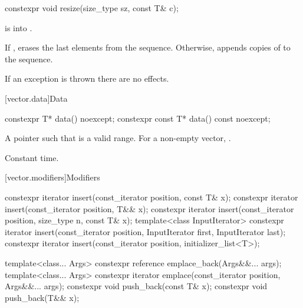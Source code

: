 %
\begin{itemdecl}
constexpr void resize(size_type sz, const T& c);
\end{itemdecl}

\begin{itemdescr}
\pnum
\pnum
\expects
{} is
 into .

\effects
If , erases the last  elements
from the sequence. Otherwise,
appends  copies of  to the sequence.

\pnum
\remarks
If an exception is thrown there are no effects.
\end{itemdescr}

[vector.data]{Data}

%
\begin{itemdecl}
constexpr T*         data() noexcept;
constexpr const T*   data() const noexcept;
\end{itemdecl}

\begin{itemdescr}
\pnum
\returns
A pointer such that  is a valid range. For a
non-empty vector,  \tcode{==} .

\pnum
\complexity
Constant time.
\end{itemdescr}

[vector.modifiers]{Modifiers}

%
\begin{itemdecl}
constexpr iterator insert(const_iterator position, const T& x);
constexpr iterator insert(const_iterator position, T&& x);
constexpr iterator insert(const_iterator position, size_type n, const T& x);
template<class InputIterator>
  constexpr iterator insert(const_iterator position, InputIterator first, InputIterator last);
constexpr iterator insert(const_iterator position, initializer_list<T>);

template<class... Args> constexpr reference emplace_back(Args&&... args);
template<class... Args> constexpr iterator emplace(const_iterator position, Args&&... args);
constexpr void push_back(const T& x);
constexpr void push_back(T&& x);
\end{itemdecl}

